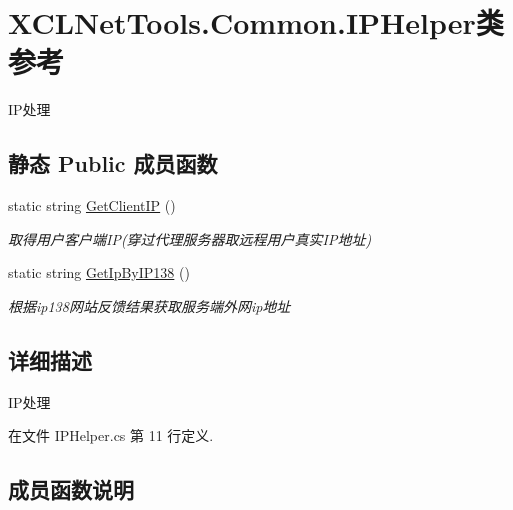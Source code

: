 \hypertarget{class_x_c_l_net_tools_1_1_common_1_1_i_p_helper}{}\section{X\+C\+L\+Net\+Tools.\+Common.\+I\+P\+Helper类 参考}
\label{class_x_c_l_net_tools_1_1_common_1_1_i_p_helper}


I\+P处理  


\subsection*{静态 Public 成员函数}
\begin{DoxyCompactItemize}
\item 
static string \hyperlink{class_x_c_l_net_tools_1_1_common_1_1_i_p_helper_ae7a3e0c167df7283ca2767d4f24376dd}{Get\+Client\+IP} ()
\begin{DoxyCompactList}\small\item\em 取得用户客户端\+IP(穿过代理服务器取远程用户真实\+I\+P地址) \end{DoxyCompactList}\item 
static string \hyperlink{class_x_c_l_net_tools_1_1_common_1_1_i_p_helper_a578759afdfe7ee27b6ff5410e073bdd9}{Get\+Ip\+By\+I\+P138} ()
\begin{DoxyCompactList}\small\item\em 根据ip138网站反馈结果获取服务端外网ip地址 \end{DoxyCompactList}\end{DoxyCompactItemize}


\subsection{详细描述}
I\+P处理 



在文件 I\+P\+Helper.\+cs 第 11 行定义.



\subsection{成员函数说明}
\mbox{\label{class_x_c_l_net_tools_1_1_common_1_1_i_p_helper_ae7a3e0c167df7283ca2767d4f24376dd}} 
